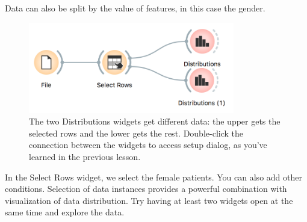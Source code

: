 \newpage
Data can also be split by the value of features, in this case the gender.

\begin{figure}[h]
  \centering
  \includegraphics[width=90mm]{select-rows-workflow.png}%
  \caption{The two Distributions widgets get different data: the upper gets the selected rows and the lower gets the rest. Double-click the connection between the widgets to access setup dialog, as you've learned in the previous lesson.}
  \label{fig:basic_data_exploration-fig3}
\end{figure}

In the Select Rows widget, we select the female patients. You can also add other conditions. Selection of data instances provides a powerful combination with visualization of data distribution. Try having at least two widgets open at the same time and explore the data.

